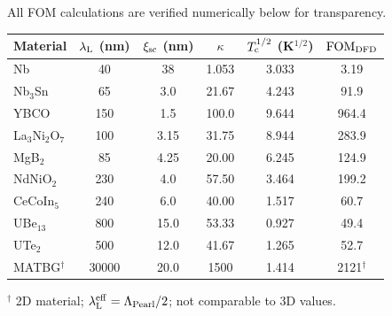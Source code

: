\documentclass[11pt]{article}
\newcommand{\lambdaL}{\lambda_{\rm L}}
\newcommand{\xsc}{\xi_{\rm sc}}
\newcommand{\Tc}{T_{\rm c}}
\newcommand{\FOM}{\mathrm{FOM}}
\begin{document}
All FOM calculations are verified numerically below for transparency.

\begin{center}
\begin{tabular}{lccccc}
\toprule
Material & $\lambdaL$ (nm) & $\xsc$ (nm) & $\kappa$ & $\Tc^{1/2}$ (K$^{1/2}$)
  & $\FOM_{\rm DFD}$ \\
\midrule
Nb            & 40   & 38   & 1.053 & 3.033 & 3.19   \\
Nb$_3$Sn      & 65   & 3.0  & 21.67 & 4.243 & 91.9   \\
YBCO          & 150  & 1.5  & 100.0 & 9.644 & 964.4  \\
La$_3$Ni$_2$O$_7$ & 100 & 3.15 & 31.75 & 8.944 & 283.9 \\
MgB$_2$       & 85   & 4.25 & 20.00 & 6.245 & 124.9  \\
NdNiO$_2$     & 230  & 4.0  & 57.50 & 3.464 & 199.2  \\
CeCoIn$_5$    & 240  & 6.0  & 40.00 & 1.517 & 60.7   \\
UBe$_{13}$    & 800  & 15.0 & 53.33 & 0.927 & 49.4   \\
UTe$_2$       & 500  & 12.0 & 41.67 & 1.265 & 52.7   \\
MATBG$^\dagger$ & 30000 & 20.0 & 1500 & 1.414 & 2121$^\dagger$ \\
\bottomrule
\end{tabular}
\end{center}

\noindent$^\dagger$ 2D material; $\lambdaL^{\rm eff} = \Lambda_{\rm Pearl}/2$;
not comparable to 3D values.
\end{document}
